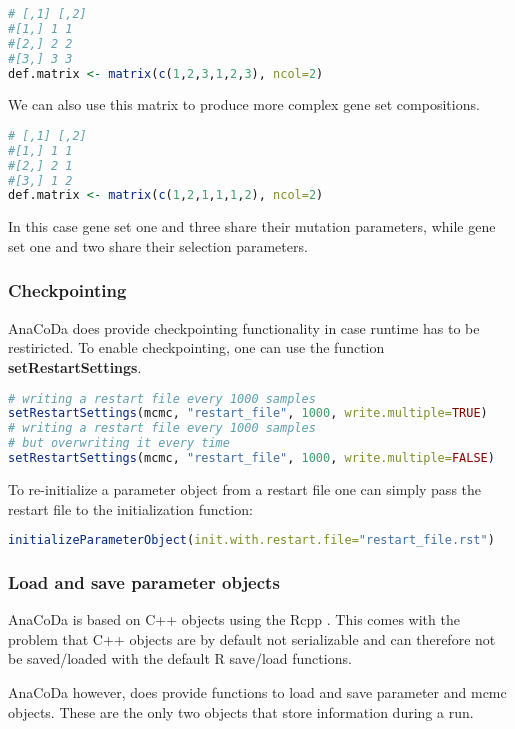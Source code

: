 \begin{lstlisting}[language=R]
# [,1] [,2]
#[1,] 1 1
#[2,] 2 2
#[3,] 3 3
def.matrix <- matrix(c(1,2,3,1,2,3), ncol=2)
\end{lstlisting}

We can also use this matrix to produce more complex gene set compositions.

\begin{lstlisting}[language=R]
# [,1] [,2]
#[1,] 1 1
#[2,] 2 1
#[3,] 1 2
def.matrix <- matrix(c(1,2,1,1,1,2), ncol=2)
\end{lstlisting}

In this case gene set one and three share their mutation parameters, while gene set one and two share their selection parameters.

\subsubsection{Checkpointing}

AnaCoDa does provide checkpointing functionality in case runtime has to be restiricted. 
To enable checkpointing, one can use the function \textbf{setRestartSettings}.

\begin{lstlisting}[language=R]
# writing a restart file every 1000 samples
setRestartSettings(mcmc, "restart_file", 1000, write.multiple=TRUE)
# writing a restart file every 1000 samples 
# but overwriting it every time
setRestartSettings(mcmc, "restart_file", 1000, write.multiple=FALSE)
\end{lstlisting}

To re-initialize a parameter object from a restart file one can simply pass the restart file to the initialization function:

\begin{lstlisting}[language=R]
initializeParameterObject(init.with.restart.file="restart_file.rst")
\end{lstlisting}

\subsubsection{Load and save parameter objects}
AnaCoDa is based on C++ objects using the Rcpp \citep{rcpp_package}. 
This comes with the problem that C++ objects are by default not serializable and can therefore not be saved/loaded with the default R save/load functions.

AnaCoDa however, does provide functions to load and save parameter and mcmc objects. 
These are the only two objects that store information during a run.

